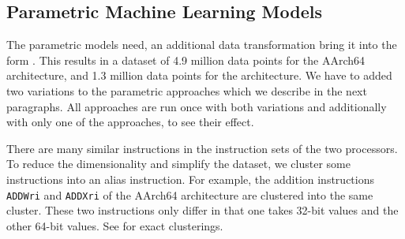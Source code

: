 \subsection{Parametric Machine Learning Models}
The parametric models need, an additional data transformation bring it into the form .
This results in a dataset of 4.9 million data points for the AArch64 architecture, and 1.3 million data points for the \aurora architecture.
We have to added two variations to the parametric approaches which we describe in the next paragraphs.
All approaches are run once with both variations and additionally with only one of the approaches, to see their effect.

There are many similar instructions in the instruction sets of the two processors.
To reduce the dimensionality and simplify the dataset, we cluster some instructions into an alias instruction.
For example, the addition instructions \lstinline|ADDWri| and \lstinline|ADDXri| of the AArch64 architecture are clustered into the same cluster.
These two instructions only differ in that one takes 32-bit values and the other 64-bit values.
See  for exact clusterings.

